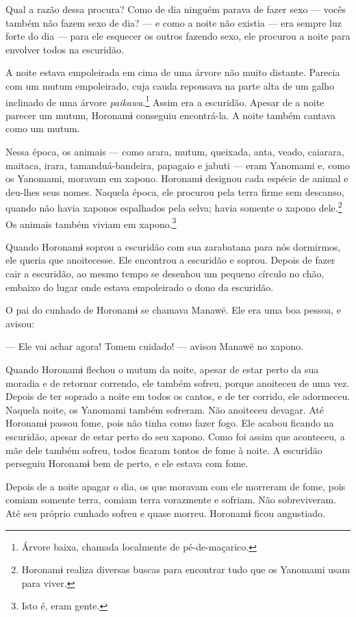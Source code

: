 Qual a razão dessa procura? Como de dia ninguém parava de fazer sexo ---
vocês também não fazem sexo de dia? --- e como a noite não existia ---
era sempre luz forte do dia --- para ele esquecer os outros fazendo
sexo, ele procurou a noite para envolver todos na escuridão. 

A noite estava empoleirada em cima de uma árvore não muito distante.
Parecia com um mutum empoleirado, cuja cauda repousava na parte alta de
um galho inclinado de uma árvore \textit{paikawa}.\footnote{Árvore baixa, chamada localmente de pé-de-maçarico.}  Assim era a escuridão. Apesar de a noite parecer um mutum, Horonamɨ conseguiu
encontrá-la. A noite também cantava como um mutum. 

Nessa época, os animais --- como arara, mutum, queixada, anta, veado,
caiarara, maitaca, irara, tamanduá-bandeira, papagaio e jabuti --- eram
Yanomami e, como os Yanomami, moravam em xapono. Horonamɨ designou cada
espécie de animal e deu-lhes seus nomes. Naquela época, ele procurou
pela terra firme sem descanso, quando não havia xaponos espalhados pela
selva; havia somente o xapono dele.\footnote{  Horonamɨ realiza diversas buscas 
para encontrar tudo que os Yanomami usam para viver.}  Os animais também
viviam em xapono.\footnote{Isto é, eram gente.} 

Quando Horonamɨ soprou a escuridão com sua zarabatana para nós
dormirmos, ele queria que anoitecesse. Ele encontrou a escuridão e
soprou. Depois de fazer cair a escuridão, ao mesmo tempo se desenhou um
pequeno círculo no chão, embaixo do lugar onde estava empoleirado o dono
da escuridão.

O pai do cunhado de Horonamɨ se chamava Manawë. Ele era uma boa pessoa,
e avisou: 

 --- Ele vai achar agora! Tomem cuidado! --- avisou Manawë no xapono. 

Quando Horonamɨ flechou o mutum da noite, apesar de estar perto da sua
moradia e de retornar correndo, ele também sofreu, porque anoiteceu
de uma vez. Depois de ter soprado a noite em todos os cantos, e de ter
corrido, ele adormeceu. Naquela noite, os Yanomami também sofreram. Não
anoiteceu devagar. Até Horonamɨ passou fome, pois não tinha como fazer
fogo. Ele acabou ficando na escuridão, apesar de estar perto do seu
xapono. Como foi assim que aconteceu, a mãe dele também sofreu, todos
ficaram tontos de fome à noite. A escuridão perseguiu Horonamɨ bem de
perto, e ele estava com fome. 

Depois de a noite apagar o dia, os que moravam com ele morreram de
fome, pois comiam somente terra, comiam terra vorazmente e sofriam. Não
sobreviveram. Até seu próprio cunhado sofreu e quase morreu. Horonamɨ
ficou angustiado.

